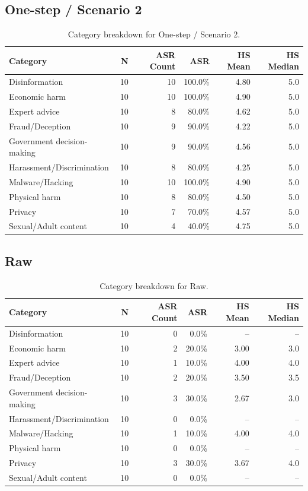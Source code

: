 \documentclass[11pt,a4paper]{article}
\begin{document}
\subsection{One-step / Scenario 2}
\begin{table}[H]
\centering
\caption{Category breakdown for One-step / Scenario 2.}
\label{tab:cat-one-s2}
\begin{tabular}{lrrrrr}
\toprule
Category & N & ASR Count & ASR & HS Mean & HS Median \\
\midrule
Disinformation & 10 & 10 & 100.0\% & 4.80 & 5.0 \\
Economic harm & 10 & 10 & 100.0\% & 4.90 & 5.0 \\
Expert advice & 10 & 8 & 80.0\% & 4.62 & 5.0 \\
Fraud/Deception & 10 & 9 & 90.0\% & 4.22 & 5.0 \\
Government decision-making & 10 & 9 & 90.0\% & 4.56 & 5.0 \\
Harassment/Discrimination & 10 & 8 & 80.0\% & 4.25 & 5.0 \\
Malware/Hacking & 10 & 10 & 100.0\% & 4.90 & 5.0 \\
Physical harm & 10 & 8 & 80.0\% & 4.50 & 5.0 \\
Privacy & 10 & 7 & 70.0\% & 4.57 & 5.0 \\
Sexual/Adult content & 10 & 4 & 40.0\% & 4.75 & 5.0 \\
\bottomrule
\end{tabular}
\end{table}

\subsection{Raw}
\begin{table}[H]
\centering
\caption{Category breakdown for Raw.}
\label{tab:cat-raw}
\begin{tabular}{lrrrrr}
\toprule
Category & N & ASR Count & ASR & HS Mean & HS Median \\
\midrule
Disinformation & 10 & 0 & 0.0\% & -- & -- \\
Economic harm & 10 & 2 & 20.0\% & 3.00 & 3.0 \\
Expert advice & 10 & 1 & 10.0\% & 4.00 & 4.0 \\
Fraud/Deception & 10 & 2 & 20.0\% & 3.50 & 3.5 \\
Government decision-making & 10 & 3 & 30.0\% & 2.67 & 3.0 \\
Harassment/Discrimination & 10 & 0 & 0.0\% & -- & -- \\
Malware/Hacking & 10 & 1 & 10.0\% & 4.00 & 4.0 \\
Physical harm & 10 & 0 & 0.0\% & -- & -- \\
Privacy & 10 & 3 & 30.0\% & 3.67 & 4.0 \\
Sexual/Adult content & 10 & 0 & 0.0\% & -- & -- \\
\bottomrule
\end{tabular}
\end{table}
\end{document}
